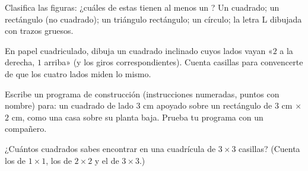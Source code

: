 \begin{exercise}[$\star$]\label{exo:g3:shapes:8}
Clasifica las figuras: ¿cuáles de estas tienen al menos un ?
Un cuadrado; un rectángulo (no cuadrado); un triángulo rectángulo; un círculo; la
letra L dibujada con trazos gruesos.
\end{exercise}

\begin{exercise}[$\star\star$]\label{exo:g3:shapes:9}
En papel cuadriculado, dibuja un cuadrado inclinado cuyos lados vayan «$2$ a la derecha, $1$
arriba» (y los giros correspondientes). Cuenta casillas para convencerte de
que los cuatro lados miden lo mismo.
\end{exercise}

\begin{exercise}[$\star\star$]\label{exo:g3:shapes:10}
Escribe un programa de construcción (instrucciones numeradas, puntos con nombre)
para: un cuadrado de lado $3$ cm apoyado sobre un rectángulo de
$3$ cm $\times$ $2$ cm, como una casa sobre su planta baja. Prueba tu
programa con un compañero.
\end{exercise}

\begin{exercise}[$\star\star$]\label{exo:g3:shapes:11}
¿Cuántos cuadrados sabes encontrar en una cuadrícula de $3 \times 3$
casillas? (Cuenta los de $1 \times 1$, los de $2 \times 2$ y el de
$3 \times 3$.)
\end{exercise}
